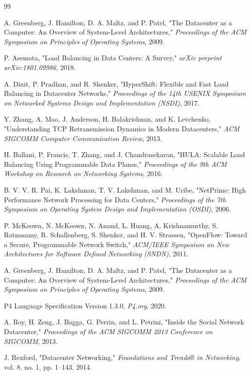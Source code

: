\documentclass[12pt,a4paper]{article}
\begin{document}
\newpage
\begin{thebibliography}{99}

 A. Greenberg, J. Hamilton, D. A. Maltz, and P. Patel, "The Datacenter as a Computer: An Overview of System-Level Architectures," \textit{Proceedings of the ACM Symposium on Principles of Operating Systems}, 2009.

 P. Asemota, "Load Balancing in Data Centers: A Survey," \textit{arXiv preprint arXiv:1801.09986}, 2018.

 A. Dixit, P. Pradhan, and R. Shenker, "HyperShift: Flexible and Fast Load Balancing in Datacenter Networks," \textit{Proceedings of the 14th USENIX Symposium on Networked Systems Design and Implementation (NSDI)}, 2017.

 Y. Zhang, A. Mao, J. Anderson, H. Balakrishnan, and K. Levchenko, "Understanding TCP Retransmission Dynamics in Modern Datacenters," \textit{ACM SIGCOMM Computer Communication Review}, 2013.

 H. Ballani, P. Francis, T. Zhang, and J. Chandrasekaran, "HULA: Scalable Load Balancing Using Programmable Data Planes," \textit{Proceedings of the 9th ACM Workshop on Research on Networking Systems}, 2016.

 B. V. V. R. Pai, K. Lakshman, T. V. Lakshman, and M. Uribe, "NetPrime: High Performance Network Processing for Data Centers," \textit{Proceedings of the 7th Symposium on Operating System Design and Implementation (OSDI)}, 2006.

 P. McKeown, N. McKeown, N. Anand, L. Huang, A. Krishnamurthy, S. Ratnasamy, R. Schallenberg, S. Shenker, and H. V. Strassen, "OpenFlow: Toward a Secure, Programmable Network Switch," \textit{ACM/IEEE Symposium on New Architectures for Software Defined Networking (SNDN)}, 2011.

 A. Greenberg, J. Hamilton, D. A. Maltz, and P. Patel, "The Datacenter as a Computer: An Overview of System-Level Architectures," \textit{Proceedings of the ACM Symposium on Principles of Operating Systems}, 2009.

 P4 Language Specification Version 1.3.0, \textit{P4.org}, 2020.

 A. Roy, H. Zeng, J. Bagga, G. Perrin, and L. Petrini, "Inside the Social Network Datacenter," \textit{Proceedings of the ACM SIGCOMM 2013 Conference on SIGCOMM}, 2013.

 J. Rexford, "Datacenter Networking," \textit{Foundations and Trends® in Networking}, vol. 8, no. 1, pp. 1--143, 2014.


\end{thebibliography}
\end{document}
